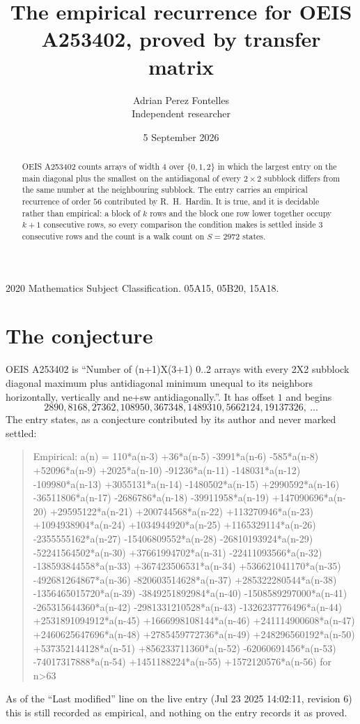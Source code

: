\documentclass[11pt,a4paper]{article}
\title{The empirical recurrence for OEIS A253402, proved by transfer matrix}
\author{Adrian Perez Fontelles\\ \small Independent researcher}
\date{5 September 2026}
\theoremstyle{plain}
\theoremstyle{definition}
\begin{document}
\maketitle

\begin{abstract}
OEIS A253402 counts arrays of width $4$ over $\{0,1,2\}$ in which the largest entry on the main diagonal plus the smallest on the antidiagonal of every $2\times2$ subblock differs from the same number at the neighbouring subblock. The entry carries an
empirical recurrence of order $56$ contributed by R.~H.~Hardin. It is true, and it is
decidable rather than empirical: a block of $k$ rows and the block one row lower together
occupy $k+1$ consecutive rows, so every comparison the condition makes is settled inside
$3$ consecutive rows and the count is a walk count on $S=2972$ states.
\end{abstract}

\noindent\small 2020 Mathematics Subject Classification. 05A15, 05B20, 15A18.\normalsize

\section{The conjecture}

OEIS A253402 is ``Number of (n+1)X(3+1) 0..2 arrays with every 2X2 subblock diagonal maximum plus antidiagonal minimum unequal to its neighbors horizontally, vertically and ne+sw antidiagonally.''. It has offset $1$ and begins
\[
2890, 8168, 27362, 108950, 367348, 1489310, 5662124, 19137326,\ \dots
\]
The entry states, as a conjecture contributed by its author and never marked settled:
\begin{quote}
Empirical: a(n) = 110*a(n-3) +36*a(n-5) -3991*a(n-6) -585*a(n-8) +52096*a(n-9) +2025*a(n-10) -91236*a(n-11) -148031*a(n-12) -109980*a(n-13) +3055131*a(n-14) -1480502*a(n-15) +2990592*a(n-16) -36511806*a(n-17) -2686786*a(n-18) -39911958*a(n-19) +147090696*a(n-20) +29595122*a(n-21) +200744568*a(n-22) +113270946*a(n-23) +1094938904*a(n-24) +1034944920*a(n-25) +1165329114*a(n-26) -2355555162*a(n-27) -15406809552*a(n-28) -26810193924*a(n-29) -52241564502*a(n-30) +37661994702*a(n-31) -22411093566*a(n-32) -138593844558*a(n-33) +367423506531*a(n-34) +536621041170*a(n-35) -492681264867*a(n-36) -820603514628*a(n-37) +285322280544*a(n-38) -1356465015720*a(n-39) -3849251892984*a(n-40) -1508589297000*a(n-41) -265315644360*a(n-42) -2981331210528*a(n-43) -1326237776496*a(n-44) +2531891094912*a(n-45) +1666998108144*a(n-46) +241114900608*a(n-47) +2460625647696*a(n-48) +2785459772736*a(n-49) +248296560192*a(n-50) +537352144128*a(n-51) +856233711360*a(n-52) -62060691456*a(n-53) -74017317888*a(n-54) +1451188224*a(n-55) +1572120576*a(n-56) for n>63
\end{quote}
As of the ``Last modified'' line on the live entry (Jul 23 2025 14:02:11, revision 6) this is still
recorded as empirical, and nothing on the entry records it as proved.
\end{document}
